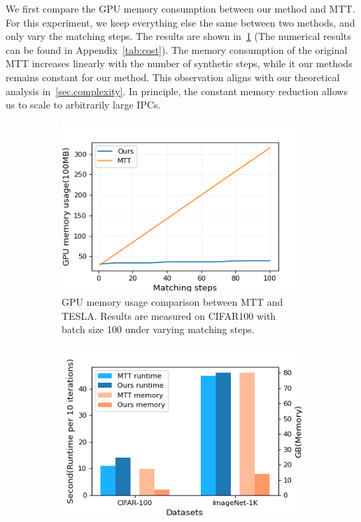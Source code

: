 \documentclass[10pt,twocolumn,letterpaper]{article}
\begin{document}
We first compare the GPU memory consumption between our method and MTT. For this experiment, we keep everything else the same between two methods, and only vary the matching steps.
The results are shown in~\cref{fig:memory_cost} (The numerical results can be found in Appendix~\cref{tab:cost}).
The memory consumption of the original MTT increases linearly with the number of synthetic steps, while it our methods remains constant for our method.
This observation aligns with our theoretical analysis in~\cref{sec.complexity}.
In principle, the constant memory reduction allows us to scale to arbitrarily large IPCs.
\begin{figure}
\vspace{-4mm}
\centering
\begin{subfigure}[t]{0.8\linewidth}\centering
\includegraphics[width=\textwidth]{images/memory_usage.png}
\caption{GPU memory usage comparison between MTT and TESLA. Results are measured on CIFAR100 with batch size 100 under varying matching steps.}
\label{fig:memory_cost}
\end{subfigure}
\begin{subfigure}[t]{0.8\linewidth}\centering
    \includegraphics[width=\textwidth]{images/memory_vs_runtime.png}

\end{subfigure}
\end{figure}
\end{document}
